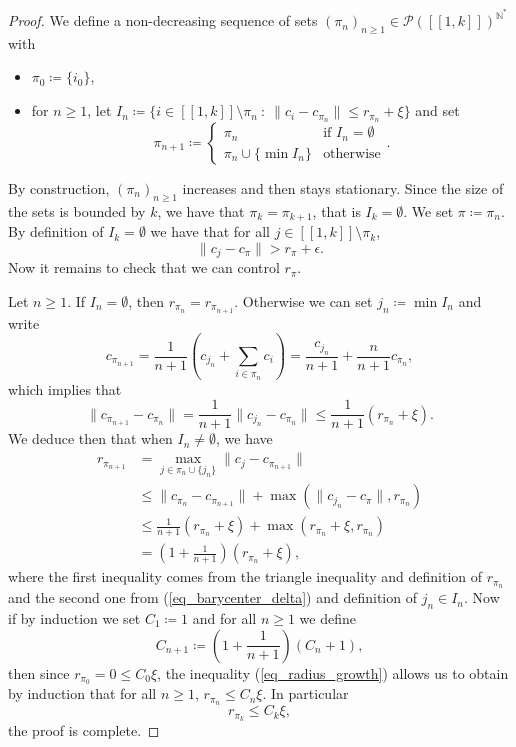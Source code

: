 \documentclass[a4paper, 11pt]{article}
\theoremstyle{plain}
\theoremstyle{definition}
\newcommand{\N}{\mathbb{N}}
\newcommand{\range}[2]{[\![#1,#2]\!]}
\numberwithin{equation}{section}
\begin{document}
\begin{proof}
     We define a non-decreasing sequence of sets $(\pi_{n})_{n\geq 1}\in\mathcal P(\range{1}{k})^{\N^*}$ with
        \begin{itemize}
            \item $\pi_0\coloneqq\{i_0\}$,
            \item for $n\geq1$, let $I_n\coloneqq\{i\in \range{1}{k}\setminus\pi_n~:~\|c_i-c_{\pi_n}\|\leq r_{\pi_n}+\xi\}$ and set
                $$\pi_{n+1}\coloneqq
                    \begin{cases}
                        \pi_n  & \text{if } I_n=\emptyset \\
                        \pi_n\cup\{\min I_n\} & \text{otherwise}
                    \end{cases}.$$
        \end{itemize}
    By construction, $(\pi_n)_{n\geq 1}$ increases and then stays stationary. Since the size of the sets is bounded by $k$, we have that $\pi_k=\pi_{k+1}$, that is $I_k=\emptyset$. We set $\pi\coloneqq \pi_n$. By definition of $I_k=\emptyset$ we have that for all $j\in\range{1}{k}\setminus\pi_k$,
        $$\|c_j-c_\pi\|>r_\pi+\epsilon.$$
    Now it remains to check that we can control $r_\pi$. 
    
    Let $n\geq 1$. If $I_n=\emptyset$, then $r_{\pi_n}=r_{\pi_{n+1}}$. Otherwise we can set $j_n\coloneqq\min I_n$ and write
        $$c_{\pi_{n+1}}=\frac{1}{n+1}\left(c_{j_n}+\sum_{i\in\pi_n}c_i\right)=\frac{c_{j_n}}{n+1}+\frac{n}{n+1}c_{\pi_n},$$
    which implies that
    \begin{equation}
        \label{eq_barycenter_delta}
        \|c_{\pi_{n+1}}-c_{\pi_n}\|=\frac{1}{n+1}\|c_{j_n}-c_{\pi_n}\|\leq \frac{1}{n+1}(r_{\pi_n}+\xi).
    \end{equation}
    We deduce then that when $I_n\neq\emptyset$, we have
    \begin{equation}
        \label{eq_radius_growth}
        \begin{split}
            r_{\pi_{n+1}}&=\max_{j\in\pi_n\cup\{j_n\}}\|c_j-c_{\pi_{n+1}}\|\\
            &\leq\|c_{\pi_n}-c_{\pi_{n+1}}\|+\max\left(\|c_{j_n}-c_\pi\|,r_{\pi_n}\right)\\
            &\leq\frac{1}{n+1}(r_{\pi_n}+\xi)+\max(r_{\pi_n}+\xi,r_{\pi_n})\\
            &=\left(1+\frac{1}{n+1}\right)(r_{\pi_n}+\xi),
        \end{split}
    \end{equation}
    where the first inequality comes from the triangle inequality and definition of $r_{\pi_n}$ and the second one from (\ref{eq_barycenter_delta}) and definition of $j_n\in I_n$. Now if by induction we set $C_1\coloneqq 1$ and for all $n\geq1$ we define 
        $$C_{n+1}\coloneqq\left(1+\frac{1}{n+1}\right)(C_n+1),$$
    then since $r_{\pi_0}=0\leq C_0\xi$, the inequality (\ref{eq_radius_growth}) allows us to obtain by induction that for all $n\geq 1$, $r_{\pi_n}\leq C_n\xi$. In particular
        $$r_{\pi_k}\leq C_k\xi,$$
    the proof is complete.
\end{proof}
\end{document}
